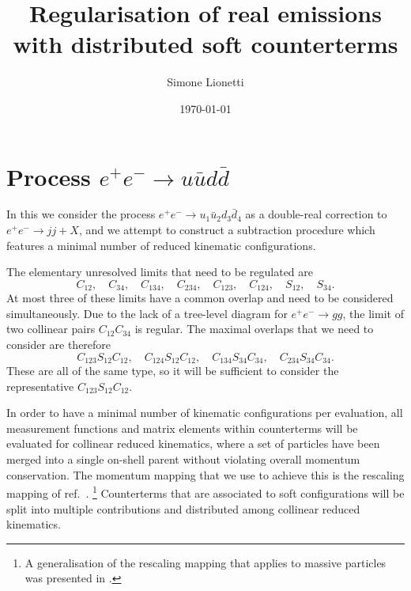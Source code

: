 \documentclass[11pt,a4paper]{article}
\title{Regularisation of real emissions
with distributed soft counterterms}
\author{Simone Lionetti}
\date{\today}
\begin{document}
\maketitle


\section{Process $e^+e^- \to u\bar{u}d\bar{d}$}
\label{sec:uuxddx}

In this  we consider the process
$e^+e^- \to u_1\bar{u}_2d_3\bar{d}_4$
as a double-real correction to $e^+e^- \to jj+X$,
and we attempt to construct a subtraction procedure
which features a minimal number of reduced kinematic configurations.

The elementary unresolved limits that need to be regulated are
\begin{equation}
\label{eq:ee2uuxddxelem}
	C_{12}, \quad C_{34}, \quad
	C_{134}, \quad C_{234}, \quad C_{123}, \quad C_{124}, \quad
	S_{12}, \quad S_{34}.
\end{equation}
At most three of these limits have a common overlap
and need to be considered simultaneously.
Due to the lack of a tree-level diagram for $e^+e^- \to gg$,
the limit of two collinear pairs $C_{12}C_{34}$ is regular.
The maximal overlaps that we need to consider are therefore
\begin{equation}
	C_{123}S_{12}C_{12}, \quad
	C_{124}S_{12}C_{12}, \quad
	C_{134}S_{34}C_{34}, \quad
	C_{234}S_{34}C_{34}.
\end{equation}
These are all of the same type,
so it will be sufficient to consider the representative $C_{123}S_{12}C_{12}$.

In order to have a minimal number of kinematic configurations per evaluation,
all measurement functions and matrix elements within counterterms
will be evaluated for collinear reduced kinematics,
where a set of particles have been merged into a single on-shell parent
without violating overall momentum conservation.
The momentum mapping that we use to achieve this
is the rescaling mapping of ref.~\cite{Somogyi:2006da}.%
\footnote{
A generalisation of the rescaling mapping
that applies to massive particles was presented in \cite{}.
}
Counterterms that are associated to soft configurations
will be split into multiple contributions
and distributed among collinear reduced kinematics.
\end{document}
